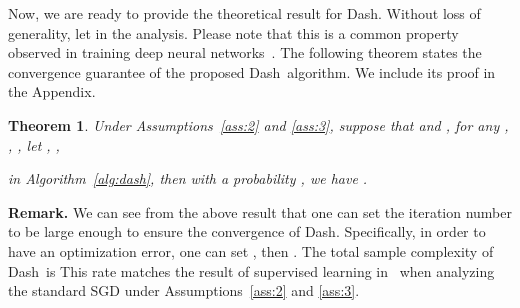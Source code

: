 \documentclass{article}
\newtheorem{thm}{Theorem}
\def \Alg {Dash}
\begin{document}
Now, we are ready to provide the theoretical result for \Alg. Without loss of generality, let  in the analysis. Please note that this is a common property observed in training deep neural networks~\citep{zhang2016understanding,allen2019convergence,du2019gradient,arora2019fine,chizat2019lazy, hastie2019surprises,yun2019small}.
The following theorem states the convergence guarantee of the proposed \Alg~algorithm. We include its proof in the Appendix. 
\begin{thm}\label{thm:main}
Under Assumptions~\ref{ass:2} and \ref{ass:3}, suppose that  and , for any , , , let , ,

in Algorithm~\ref{alg:dash}, then with a probability , we have
    .
\end{thm}
{\bf Remark. } We can see from the above result that one can set  the iteration number  to be large enough to ensure the convergence of \Alg. Specifically, in order to have an  optimization error, one can set , then . The total sample complexity of \Alg~is 
 This rate matches the result of supervised learning in~\citep{karimi2016linear} when analyzing the standard SGD under Assumptions~\ref{ass:2} and \ref{ass:3}.
\end{document}
